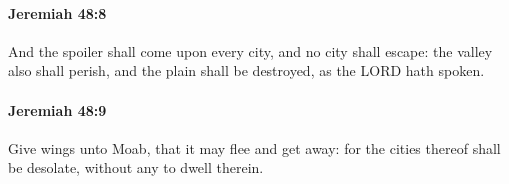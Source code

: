 		\paragraph{Jeremiah 48:8} %
			\label{JEREMIAH-48-8}

			And the spoiler shall come upon every city, and no city shall escape: the valley also shall perish, and the plain shall be destroyed, as the LORD hath spoken.


		\paragraph{Jeremiah 48:9} %
			\label{JEREMIAH-48-9}

			Give wings unto Moab, that it may flee and get away: for the cities thereof shall be desolate, without any to dwell therein.



